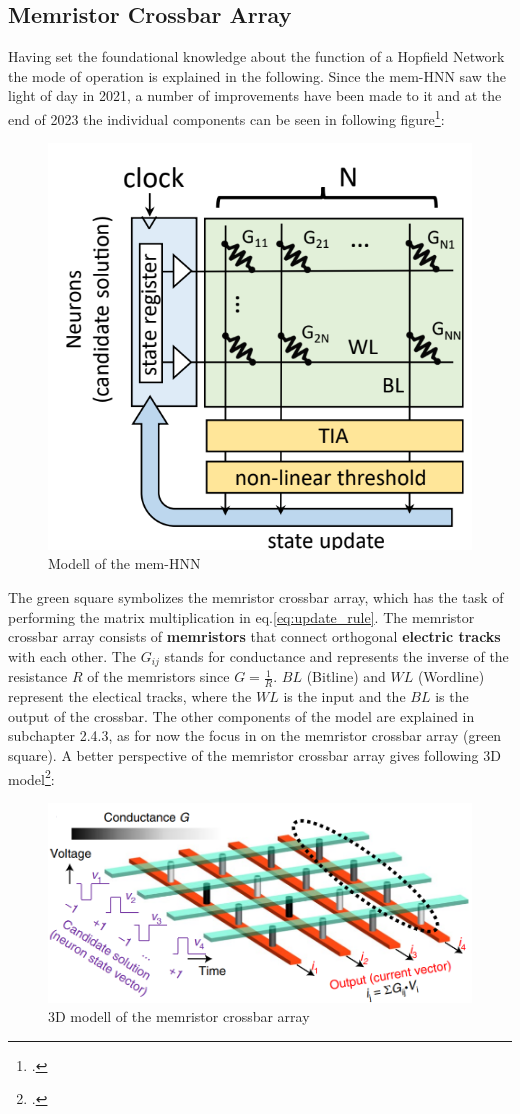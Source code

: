 \subsection{Memristor Crossbar Array}

Having set the foundational knowledge about the function of a Hopfield Network the mode of operation is explained in the following. 
Since the \ac{mem-HNN} saw the light of day in 2021, a number of improvements have been made to it and at the end of 2023 the individual components can be seen in following figure\footcite[cf.][2]{hizzaniMemristorbasedHardwareAlgorithms2023}:
\begin{figure}[H]
    \centering
    \includegraphics[width=0.3\linewidth]{graphics/Mem_HNN_Modell.png}
    \caption{Modell of the mem-HNN}
    \label{ModellHMM}
\end{figure}
The green square symbolizes the memristor crossbar array, which has the task of performing the matrix multiplication in eq.\eqref{eq:update_rule}. 
The memristor crossbar array consists of \textbf{memristors} that connect orthogonal \textbf{electric tracks} with each other.
The \( G_{ij} \) stands for conductance and represents the inverse of the resistance \( R \) of the memristors since \( G = \frac{1}{R}\).
\( BL \) (Bitline) and \( WL \) (Wordline) represent the electical tracks, where the \( WL \) is the input and the \( BL \) is the output of the crossbar.
The other components of the model are explained in subchapter 2.4.3, as for now the focus in on the memristor crossbar array (green square).
A better perspective of the memristor crossbar array gives following 3D model\footcite[cf.][410]{caiPowerefficientCombinatorialOptimization2020}:
\begin{figure}[H]
    \centering
    \includegraphics[width=0.65\linewidth]{graphics/memristor_crossbar_array.png}
    \caption{3D modell of the memristor crossbar array}
\end{figure}
